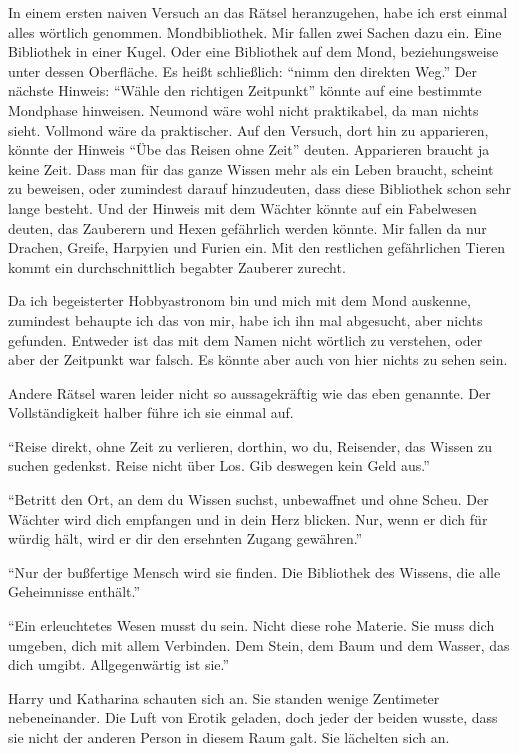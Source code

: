\begin{buch}
In einem ersten naiven Versuch an das Rätsel heranzugehen, habe ich erst einmal alles wörtlich genommen. Mondbibliothek. Mir fallen zwei Sachen dazu ein. Eine Bibliothek in einer Kugel. Oder eine Bibliothek auf dem Mond, beziehungsweise unter dessen Oberfläche. Es heißt schließlich: \enquote{\aabs nimm den direkten Weg.} Der nächste Hinweis: \enquote{Wähle den richtigen Zeitpunkt\abs} könnte auf eine bestimmte Mondphase hinweisen. Neumond wäre wohl nicht praktikabel, da man nichts sieht. Vollmond wäre da praktischer. Auf den Versuch, dort hin zu apparieren, könnte der Hinweis \enquote{Übe das Reisen ohne Zeit} deuten. Apparieren braucht ja keine Zeit. Dass man für das ganze Wissen mehr als ein Leben braucht, scheint zu beweisen, oder zumindest darauf hinzudeuten, dass diese Bibliothek schon sehr lange besteht. Und der Hinweis mit dem Wächter könnte auf ein Fabelwesen deuten, das Zauberern und Hexen gefährlich werden könnte. Mir fallen da nur Drachen, Greife, Harpyien und Furien ein. Mit den restlichen gefährlichen Tieren kommt ein durchschnittlich begabter Zauberer zurecht.

Da ich begeisterter Hobbyastronom bin und mich mit dem Mond auskenne, zumindest behaupte ich das von mir, habe ich ihn mal abgesucht, aber nichts gefunden. Entweder ist das mit dem Namen nicht wörtlich zu verstehen, oder aber der Zeitpunkt war falsch. Es könnte aber auch von hier nichts zu sehen sein.

Andere Rätsel waren leider nicht so aussagekräftig wie das eben genannte. Der Vollständigkeit halber führe ich sie einmal auf.

\enquote{Reise direkt, ohne Zeit zu verlieren, dorthin, wo du, Reisender, das Wissen zu suchen gedenkst. Reise nicht über Los. Gib deswegen kein Geld aus.}

\enquote{Betritt den Ort, an dem du Wissen suchst, unbewaffnet und ohne Scheu. Der Wächter wird dich empfangen und in dein Herz blicken. Nur, wenn er dich für würdig hält, wird er dir den ersehnten Zugang gewähren.}

\enquote{Nur der bußfertige Mensch wird sie finden. Die Bibliothek des Wissens, die alle Geheimnisse enthält.}

\enquote{Ein erleuchtetes Wesen musst du sein. Nicht diese rohe Materie. Sie muss dich umgeben, dich mit allem Verbinden. Dem Stein, dem Baum und dem Wasser, das dich umgibt. Allgegenwärtig ist sie.}
\end{buch}

Harry und Katharina schauten sich an. Sie standen wenige Zentimeter nebeneinander. Die Luft von Erotik geladen, doch jeder der beiden wusste, dass sie nicht der anderen Person in diesem Raum galt. Sie lächelten sich an.

